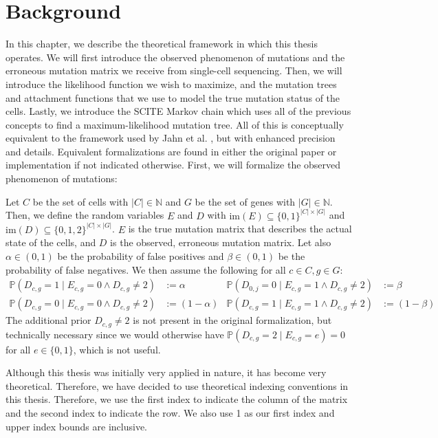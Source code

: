 \chapter{Background}
\label{ch:background}

In this chapter, we describe the theoretical framework in which this thesis operates. We will first introduce the observed phenomenon of mutations and the erroneous mutation matrix we receive from single-cell sequencing. Then, we will introduce the likelihood function we wish to maximize, and the mutation trees and attachment functions that we use to model the true mutation status of the cells. Lastly, we introduce the \ac{SCITE} Markov chain which uses all of the previous concepts to find a maximum-likelihood mutation tree. All of this is conceptually equivalent to the framework used by Jahn et al. \cite{tree2016}, but with enhanced precision and details. Equivalent formalizations are found in either the original paper or implementation if not indicated otherwise. First, we will formalize the observed phenomenon of mutations:

\begin{definition}
    \label{def:mutmatrix}
    Let $C$ be the set of cells with $|C| \in \mathbb{N}$ and $G$ be the set of genes with $|G| \in \mathbb{N}$. Then, we define the random variables $E$ and $D$ with $\mathrm{im}(E) \subseteq \{0,1\}^{|C| \times |G|}$ and $\mathrm{im}(D) \subseteq \{0, 1, 2\}^{|C| \times |G|}$. $E$ is the true mutation matrix that describes the actual state of the cells, and $D$ is the observed, erroneous mutation matrix. Let also $\alpha \in (0,1)$ be the probability of false positives and $\beta \in (0,1)$ be the probability of false negatives. We then assume the following for all $c \in C, g \in G$:
    \begin{align*}
        \mathbb{P}(D_{c,g} = 1 \mid E_{c,g} = 0 \wedge D_{c,g} \neq 2) &:= \alpha & \mathbb{P}(D_{0,j} = 0\mid E_{c,g} = 1 \wedge D_{c,g} \neq 2) &:= \beta \\
        \mathbb{P}(D_{c,g} = 0 \mid E_{c,g} = 0 \wedge D_{c,g} \neq 2) &:= (1-\alpha) & \mathbb{P}(D_{c,g} = 1 \mid E_{c,g} = 1 \wedge D_{c,g} \neq 2) &:= (1-\beta)
    \end{align*}
    The additional prior $D_{c,g} \neq 2$ is not present in the original formalization, but technically necessary since we would otherwise have $\mathbb{P}(D_{c,g} = 2 \mid E_{c,g} = e) = 0$ for all $e \in \{0,1\}$, which is not useful.
    
    Although this thesis was initially very applied in nature, it has become very theoretical. Therefore, we have decided to use theoretical indexing conventions in this thesis. Therefore, we use the first index to indicate the column of the matrix and the second index to indicate the row. We also use 1 as our first index and upper index bounds are inclusive.
\end{definition}

